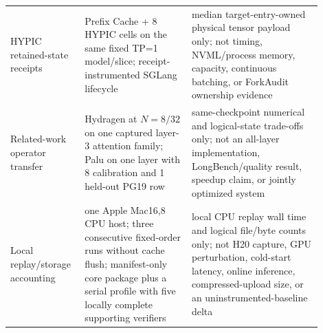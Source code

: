 \documentclass{article}
\begin{document}
\begin{longtable}{@{}>{\raggedright\arraybackslash}p{0.19\linewidth}>{\raggedright\arraybackslash}p{0.32\linewidth}>{\raggedright\arraybackslash}p{0.39\linewidth}@{}}
  HYPIC retained-state receipts & 8 Prefix Cache + 8 HYPIC cells on the same fixed TP=1 model/slice; receipt-instrumented SGLang lifecycle & median target-entry-owned physical tensor payload only; not timing, NVML/process memory, capacity, continuous batching, or ForkAudit ownership evidence \\
  Related-work operator transfer & Hydragen at $N=8/32$ on one captured layer-3 attention family; Palu on one layer with 8 calibration and 1 held-out PG19 row & same-checkpoint numerical and logical-state trade-offs only; not an all-layer implementation, LongBench/quality result, speedup claim, or jointly optimized system \\
  Local replay/storage accounting & one Apple Mac16,8 CPU host; three consecutive fixed-order runs without cache flush; manifest-only core package plus a serial profile with five locally complete supporting verifiers & local CPU replay wall time and logical file/byte counts only; not H20 capture, GPU perturbation, cold-start latency, online inference, compressed-upload size, or an uninstrumented-baseline delta \\
\end{longtable}
\endgroup
\end{document}
